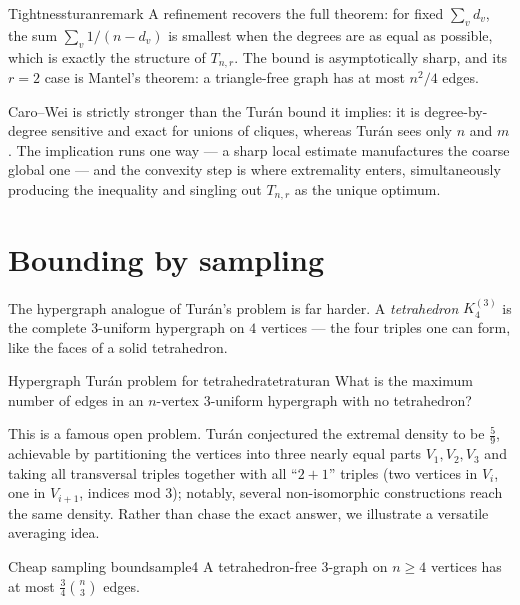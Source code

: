 \begin{remark}{Tightness}{turanremark}
A refinement recovers the full theorem: for fixed $\sum_v d_v$, the sum
$\sum_v 1/(n-d_v)$ is smallest when the degrees are as equal as possible,
which is exactly the structure of $T_{n,r}$. The bound is asymptotically
sharp, and its $r=2$ case is Mantel's theorem: a triangle-free graph has at
most $n^2/4$ edges.
\end{remark}

\begin{insight}
Caro--Wei is strictly stronger than the Tur\'an bound it implies: it is
degree-by-degree sensitive and exact for unions of cliques, whereas Tur\'an
sees only $n$ and $m$. The implication runs one way --- a sharp local
estimate manufactures the coarse global one --- and the convexity step is
where extremality enters, simultaneously producing the inequality and singling
out $T_{n,r}$ as the unique optimum.
\end{insight}

\section{Bounding by sampling}

The hypergraph analogue of Tur\'an's problem is far harder. A
\emph{tetrahedron} $K_4^{(3)}$ is the complete $3$-uniform hypergraph on $4$
vertices --- the four triples one can form, like the faces of a solid
tetrahedron.

\begin{question}{Hypergraph Tur\'an problem for tetrahedra}{tetraturan}
What is the maximum number of edges in an $n$-vertex $3$-uniform hypergraph
with no tetrahedron?
\end{question}

This is a famous open problem. Tur\'an conjectured the extremal density to be
$\tfrac59$, achievable by partitioning the vertices into three nearly equal
parts $V_1,V_2,V_3$ and taking all transversal triples together with all
``$2{+}1$'' triples (two vertices in $V_i$, one in $V_{i+1}$, indices mod
$3$); notably, several non-isomorphic constructions reach the same density.
Rather than chase the exact answer, we illustrate a versatile averaging idea.

\begin{proposition}{Cheap sampling bound}{sample4}
A tetrahedron-free $3$-graph on $n\ge4$ vertices has at most
$\tfrac34\binom n3$ edges.
\end{proposition}

